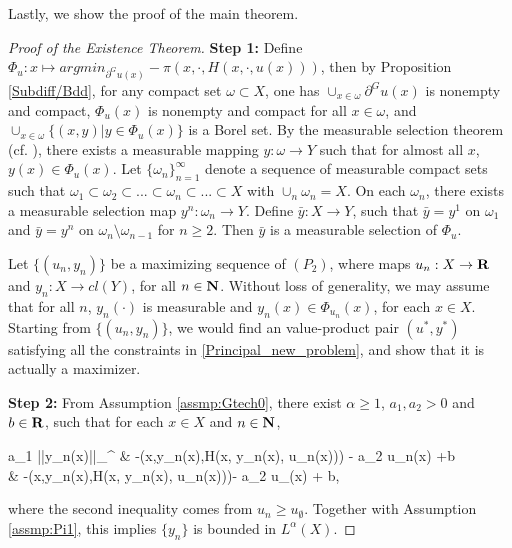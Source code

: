 Lastly, we show the proof of the main theorem.\medskip

\begin{proof}[Proof of the Existence Theorem]
	{\bf Step 1:} 	 Define $\Phi_u: x \longmapsto argmin_{\partial^G u(x)} -\pi(x, \cdot, H(x,\cdot,u(x)))$, then by Proposition \ref{Subdiff/Bdd}, for any compact set $\omega \subset X$, one has $\cup_{x \in \omega} \partial^G u(x)$ is nonempty and compact, $\Phi_u(x)$ is nonempty and compact for all $x\in \omega$, and $\cup_{x \in \omega} \{(x, y)| y \in \Phi_u(x)\}$ is a Borel set. By the measurable selection theorem (cf. \cite[Theorem 1.2, Chapter VIII]{EkelandTemam76}), there exists a measurable mapping $y: \omega \rightarrow Y$ such that for almost all $x$, $y(x) \in \Phi_u(x)$. Let $\{\omega_n\}_{n=1}^{\infty}$ denote a sequence of measurable compact sets such that $\omega_1 \subset \omega_2 \subset ... \subset \omega_n \subset ...\subset X$ with $\cup_{n}\omega_n = X$. On each $\omega_n$, there exists a measurable selection map $y^n: \omega_n \rightarrow Y$. Define $\bar{y}: X \rightarrow Y$, such that $\bar{y} = y^1$ on $\omega_1$ and $\bar{y} = y^n$ on $\omega_n\setminus \omega_{n-1}$ for $n \ge 2$. Then $\bar{y}$ is a measurable selection of $\Phi_u$. \medskip
	
	
	
	Let $\{(u_n, y_n)\}$ be a maximizing sequence of $(P_2)$, where maps $u_n: X\rightarrow {\mathbf R}$ and $y_n: X\rightarrow cl(Y)$, for all $n\in \mathbf{N}$. Without loss of generality, we may assume that for all $n$, $y_n(\cdot)$ is measurable and $y_n(x) \in \Phi_{u_n}(x)$, for each $x\in X$. Starting from $\{(u_n, y_n)\}$, we would find an value-product pair $(u^*, y^*)$ satisfying all the constraints in \eqref{Principal_new_problem}, and show that it is actually a maximizer.\medskip
	
	{\bf Step 2:} From Assumption \ref{assmp:Gtech0}, there exist $\alpha \ge 1$, $a_1, a_2> 0$ and $b\in {\mathbf R}$,  such that for each $x\in X$ and $n \in \mathbf{N}$,
	\begin{flalign*}
	a_1 ||y_n(x)||_{\alpha}^{\alpha} \le & -\pi(x,y_n(x),H(x, y_n(x), u_n(x))) - a_2 u_n(x) +b \\
	\le &  -\pi(x,y_n(x),H(x, y_n(x), u_n(x)))- a_2 u_{\emptyset}(x) + b,
	\end{flalign*}
	where the second inequality comes from $u_n\ge u_{\emptyset}$. Together with Assumption \ref{assmp:Pi1}, this implies $\{y_n\}$ is bounded in $L^{\alpha}(X)$.\medskip
	


\end{proof}

